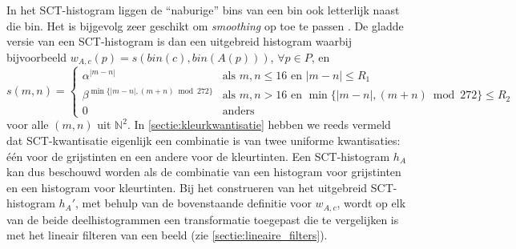 In het SCT-histogram liggen de ``naburige'' bins van een bin ook letterlijk naast
die bin. Het is bijgevolg zeer geschikt om
\emph{smoothing} op toe te passen \cite{sural:perceptually_smooth_histogram}. De gladde versie van
een SCT-histogram is dan een uitgebreid histogram waarbij bijvoorbeeld 
$w_{A,c}(p)=s(bin(c),bin(A(p)))$, $\forall p \in P$, en
$$
s(m,n)=
\left\{ \begin{array}{ll}
\alpha^{|m-n|} & \textrm{als } m, n \le 16 \textrm{ en } |m-n| \le R_1 \\
\beta^{\min\{|m-n|, (m+n) \bmod 272\}} & \textrm{als } m, n > 16 \textrm{ en } \min\{|m-n|, (m+n) \bmod 272\} \le R_2 \\ 
0 & \textrm{anders}
\end{array} \right.
$$
voor alle $(m,n)$ uit $\mathbb{N}^2$. In \ref{sectie:kleurkwantisatie} hebben 
we reeds vermeld dat SCT-kwantisatie eigenlijk een combinatie is van twee 
uniforme kwantisaties: \'e\'en voor de grijstinten en een andere voor de 
kleurtinten. Een SCT-histogram $h_A$ kan dus beschouwd 
worden als de combinatie van een histogram voor grijstinten en een histogram 
voor kleurtinten. 
Bij het construeren van het uitgebreid SCT-histogram $h_A'$, met behulp van de bovenstaande 
definitie voor $w_{A,c}$, wordt op elk van de beide deelhistogrammen een 
transformatie toegepast die te vergelijken is met het lineair filteren van
een beeld (zie \ref{sectie:lineaire_filters}). 

